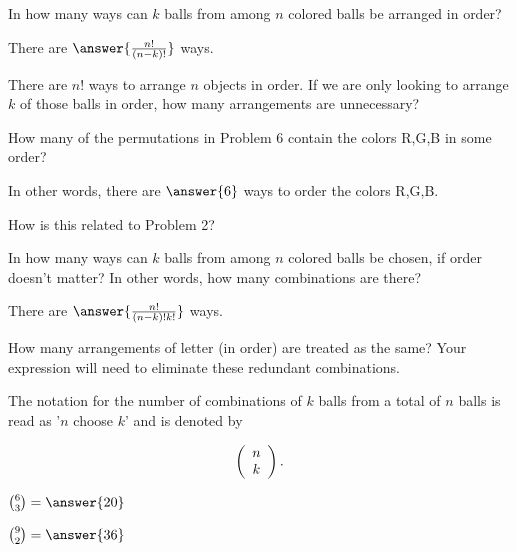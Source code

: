 \documentclass[number]{ximera}
\begin{document}
\begin{question}
In how many ways can $k$ balls from among $n$ colored balls be arranged in order?

There are $\answer{\frac{n!}{(n-k)!}}$ ways.
\begin{hint}
There are $n!$ ways to arrange $n$ objects in order. If we are only looking to arrange $k$ of those balls in order, how many arrangements are unnecessary? %
\end{hint}
\end{question}

\begin{question}
How many of the permutations in Problem 6 contain the colors R,G,B in some order? 

In other words, there are $\answer{6}$ ways to order the colors R,G,B. 

How is this related to Problem 2? 
\begin{freeResponse}
\end{freeResponse}
\end{question}

\begin{question}
In how many ways can $k$ balls from among $n$ colored balls be chosen, if order doesn't matter? 
In other words, how many combinations are there?

There are $\answer{\frac{n!}{(n-k)!k!}}$ ways.
\begin{hint}
How many arrangements of letter (in order) are treated as the same? Your expression will need to eliminate these redundant combinations.
\end{hint}
\end{question}

The notation for the number of combinations of $k$ balls from a total of $n$ balls is read as '$n$ choose $k$' and is denoted by

\[
\left( {\begin{array}{*{20}c}
n \\
k\\
\end{array}} \right).
\]

\begin{exercise}
${6\choose{3}} = \answer{20}$
\end{exercise}

\begin{exercise}
${9 \choose{2}}=\answer{36}$
\end{exercise}
\end{document}

